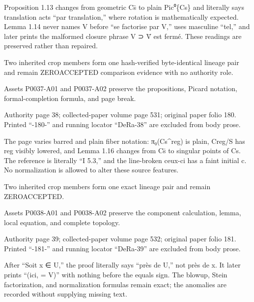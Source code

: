 \documentclass[11pt,a4paper]{article}
\begin{document}
Proposition 1.13 changes from geometric C\textunderscore{}s̄ to plain Pic⁰\textunderscore{}\{C\textunderscore{}s\} and literally says translation acts “par translation,” where rotation is mathematically expected. Lemma 1.14 never names V before “se factorise par V,” uses masculine “tel,” and later prints the malformed closure phrase V ⊃ V̄ est fermé. These readings are preserved rather than repaired.

Two inherited crop members form one hash-verified byte-identical lineage pair and remain ZERO\textunderscore{}ACCEPTED comparison evidence with no authority role.

Assets P0037-A01 and P0037-A02 preserve the propositions, Picard notation, formal-completion formula, and page break.


\par\medskip
\hypertarget{D018-P0038}{}
\par\smallskip
Authority page 38; collected-paper volume page 531; original paper folio 180. Printed “-180-” and running locator “DeRa-38” are excluded from body prose.

The page varies barred and plain fiber notation: π₀(C\textunderscore{}s\textasciicircum{}reg) is plain, C\textunderscore{}reg/S has reg visibly lowered, and Lemma 1.16 changes from C\textunderscore{}s̄ to singular points of C\textunderscore{}s. The reference is literally “I 5.3,” and the line-broken ceux-ci has a faint initial c. No normalization is allowed to alter these source features.

Two inherited crop members form one exact lineage pair and remain ZERO\textunderscore{}ACCEPTED.

Assets P0038-A01 and P0038-A02 preserve the component calculation, lemma, local equation, and complete topology.


\par\medskip
\hypertarget{D018-P0039}{}
\par\smallskip
Authority page 39; collected-paper volume page 532; original paper folio 181. Printed “-181-” and running locator “DeRa-39” are excluded from body prose.

After “Soit x ∈ U,” the proof literally says “près de U,” not près de x. It later prints “(ici, = V)” with nothing before the equals sign. The blowup, Stein factorization, and normalization formulas remain exact; the anomalies are recorded without supplying missing text.
\end{document}

